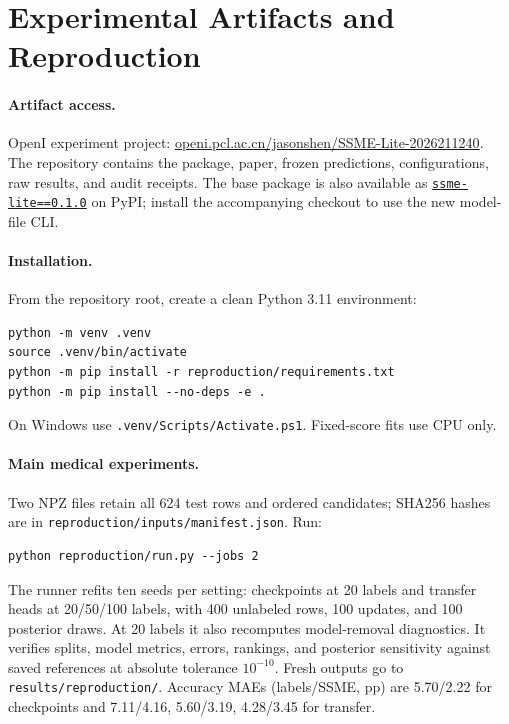 \section{Experimental Artifacts and Reproduction}
\label{app:reproduction}

\paragraph{Artifact access.}
OpenI experiment project:\newline
\href{https://openi.pcl.ac.cn/jasonshen/SSME-Lite-2026211240}{openi.pcl.ac.cn/jasonshen/SSME-Lite-2026211240}.
The repository contains the package, paper, frozen predictions, configurations,
raw results, and audit receipts. The base package is also available as
\href{https://pypi.org/project/ssme-lite/0.1.0/}{\texttt{ssme-lite==0.1.0}} on PyPI;
install the accompanying checkout to use the new model-file CLI.

\paragraph{Installation.}
From the repository root, create a clean Python 3.11 environment:
\begin{lstlisting}[basicstyle=\ttfamily\footnotesize]
python -m venv .venv
source .venv/bin/activate
python -m pip install -r reproduction/requirements.txt
python -m pip install --no-deps -e .
\end{lstlisting}
On Windows use \nolinkurl{.venv/Scripts/Activate.ps1}. Fixed-score fits use CPU only.

\paragraph{Main medical experiments.}
Two NPZ files retain all 624 test rows and ordered candidates; SHA256 hashes are
in \nolinkurl{reproduction/inputs/manifest.json}. Run:
\begin{lstlisting}[basicstyle=\ttfamily\footnotesize]
python reproduction/run.py --jobs 2
\end{lstlisting}
The runner refits ten seeds per setting: checkpoints at 20 labels and transfer
heads at 20/50/100 labels, with 400 unlabeled rows, 100 updates, and 100 posterior
draws. At 20 labels it also recomputes model-removal diagnostics. It verifies
splits, model metrics, errors, rankings, and posterior sensitivity against saved
references at absolute tolerance $10^{-10}$. Fresh outputs go to
\nolinkurl{results/reproduction/}. Accuracy MAEs (labels/SSME, pp) are
5.70/2.22 for checkpoints and 7.11/4.16, 5.60/3.19, 4.28/3.45 for transfer.

